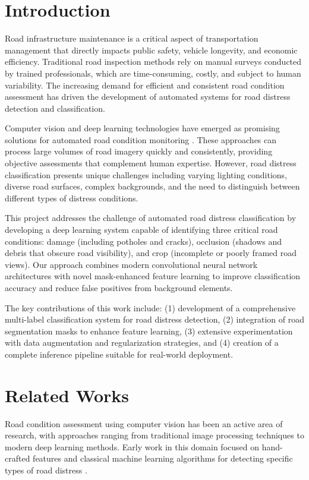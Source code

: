 \documentclass[12pt,twocolumn]{article}
\begin{document}
\section{Introduction}

Road infrastructure maintenance is a critical aspect of transportation management that directly impacts public safety, vehicle longevity, and economic efficiency. Traditional road inspection methods rely on manual surveys conducted by trained professionals, which are time-consuming, costly, and subject to human variability. The increasing demand for efficient and consistent road condition assessment has driven the development of automated systems for road distress detection and classification.

Computer vision and deep learning technologies have emerged as promising solutions for automated road condition monitoring \citet{he2016deep}. These approaches can process large volumes of road imagery quickly and consistently, providing objective assessments that complement human expertise. However, road distress classification presents unique challenges including varying lighting conditions, diverse road surfaces, complex backgrounds, and the need to distinguish between different types of distress conditions.

This project addresses the challenge of automated road distress classification by developing a deep learning system capable of identifying three critical road conditions: damage (including potholes and cracks), occlusion (shadows and debris that obscure road visibility), and crop (incomplete or poorly framed road views). Our approach combines modern convolutional neural network architectures with novel mask-enhanced feature learning to improve classification accuracy and reduce false positives from background elements.

The key contributions of this work include: (1) development of a comprehensive multi-label classification system for road distress detection, (2) integration of road segmentation masks to enhance feature learning, (3) extensive experimentation with data augmentation and regularization strategies, and (4) creation of a complete inference pipeline suitable for real-world deployment.

\section{Related Works}

Road condition assessment using computer vision has been an active area of research, with approaches ranging from traditional image processing techniques to modern deep learning methods. Early work in this domain focused on hand-crafted features and classical machine learning algorithms for detecting specific types of road distress \citet{bishop2006pattern}.
\end{document}
